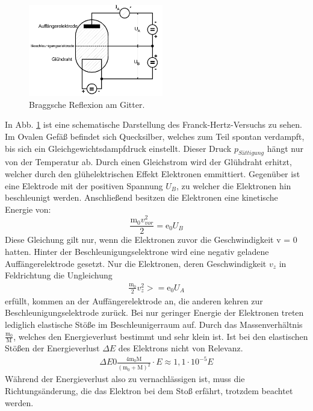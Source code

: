 \begin{figure}
    \centering
    \includegraphics[height=4.0cm]{data/abb1.jpg}
    \caption{Braggsche Reflexion am Gitter. \cite{V601}}
    \label{fig:abb1}
\end{figure}
In Abb. \ref{fig:abb1} ist eine schematische Darstellung des Franck-Hertz-Versuchs zu sehen.
Im Ovalen Gefäß befindet sich Quecksilber, welches zum Teil spontan verdampft, bis sich ein Gleichgewichtsdampfdruck einstellt.
Dieser Druck $p_{Sättigung}$ hängt nur von der Temperatur ab.
Durch einen Gleichstrom wird der Glühdraht erhitzt, welcher durch den glühelektrischen Effekt Elektronen emmittiert.
Gegenüber ist eine Elektrode mit der positiven Spannung $U_B$, zu welcher die Elektronen hin beschleunigt werden.
Anschließend besitzen die Elektronen eine kinetische Energie von:
\begin{equation}
    \frac{\text{m}_0 v_{vor}^2}{2} = \text{e}_0 U_B
    \label{eqn:gl2}
\end{equation}
Diese Gleichung gilt nur, wenn die Elektronen zuvor die Geschwindigkeit v = 0 hatten.
Hinter der Beschleunigungselektrone wird eine negativ geladene Auffängerelektrode gesetzt.
Nur die Elektronen, deren Geschwindigkeit $v_z$ in Feldrichtung die Ungleichung
\begin{align*}
    \frac{\text{m}_0}{2}v_z^2 >= \text{e}_0 U_A
\end{align*}
erfüllt, kommen an der Auffängerelektrode an, die anderen kehren zur Beschleunigungselektrode zurück.
Bei nur geringer Energie der Elektronen treten lediglich elastische Stöße im Beschleunigerraum auf.
Durch das Massenverhältnis $\frac{\text{m}_0}{\text{M}}$, welches den Energieverlust bestimmt und sehr klein ist.
Ist bei den elastischen Stößen der Energieverlust $\Delta E$ des Elektrons nicht von Relevanz.
\begin{align*}
    \Delta E 0 \frac{4 \text{m}_0 \text{M}}{(\text{m}_0 + \text{M})^2} \cdot E \approx 1,1 \cdot 10^{-5} E
\end{align*}
Während der Energieverlust also zu vernachlässigen ist, muss die Richtungsänderung, die das Elektron bei dem Stoß erfährt, trotzdem beachtet werden.
